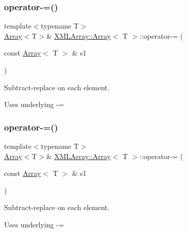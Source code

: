 \subsubsection{\texorpdfstring{operator-\/=()}{operator-=()}\hspace{0.1cm}{\footnotesize\ttfamily [1/4]}}
{\footnotesize\ttfamily template$<$typename T$>$ \\
\mbox{\hyperlink{classXMLArray_1_1Array}{Array}}$<$T$>$\& \mbox{\hyperlink{classXMLArray_1_1Array}{X\+M\+L\+Array\+::\+Array}}$<$ T $>$\+::operator-\/= (\begin{DoxyParamCaption}\item[{const \mbox{\hyperlink{classXMLArray_1_1Array}{Array}}$<$ T $>$ \&}]{s1 }\end{DoxyParamCaption})\hspace{0.3cm}{\ttfamily [inline]}}



Subtract-\/replace on each element. 

Uses underlying -\/= \mbox{\label{classXMLArray_1_1Array_aa92c6d59ed6a656c3004db85bd67c192}} 
\subsubsection{\texorpdfstring{operator-\/=()}{operator-=()}\hspace{0.1cm}{\footnotesize\ttfamily [2/4]}}
{\footnotesize\ttfamily template$<$typename T$>$ \\
\mbox{\hyperlink{classXMLArray_1_1Array}{Array}}$<$T$>$\& \mbox{\hyperlink{classXMLArray_1_1Array}{X\+M\+L\+Array\+::\+Array}}$<$ T $>$\+::operator-\/= (\begin{DoxyParamCaption}\item[{const \mbox{\hyperlink{classXMLArray_1_1Array}{Array}}$<$ T $>$ \&}]{s1 }\end{DoxyParamCaption})\hspace{0.3cm}{\ttfamily [inline]}}



Subtract-\/replace on each element. 

Uses underlying -\/= \mbox{\label{classXMLArray_1_1Array_af903951b5031ab6aa7ee8e2682055f91}} 
